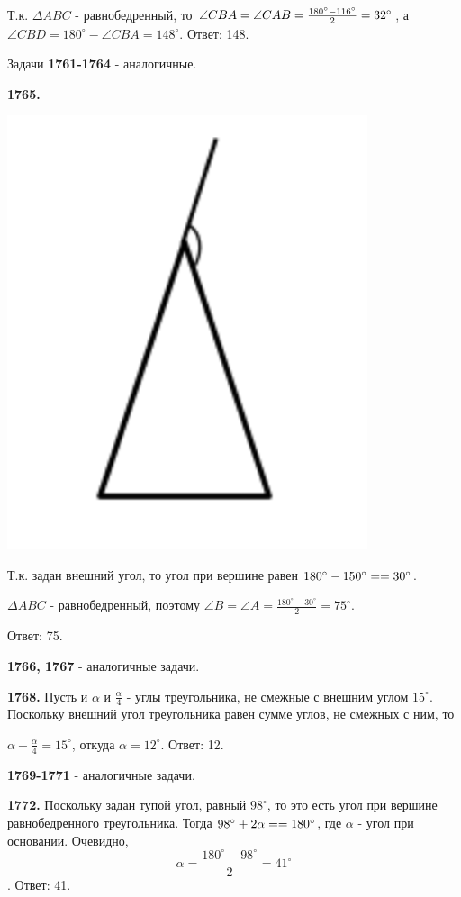 Т.к. $\Delta ABC$ - равнобедренный, то $\angle CBA = \angle CAB = \frac{180^\circ - 116^\circ}{2} = \linebreak 32^\circ$, а $\angle CBD = 180^\circ - \angle CBA = 148^\circ.$ \newline \null \hspace*{\fill} Ответ: 148.

Задачи \textbf{1761-1764} - аналогичные.

\textbf{1765.}

{\centering \includegraphics[width=0.3\linewidth]{Geometry/Content/6.png}

}

Т.к. задан внешний угол, то угол при вершине равен $180^\circ - 150^\circ = \linebreak
=30^\circ$.

$\Delta ABC$ - равнобедренный, поэтому $\angle B = \angle A = \frac{180^\circ - 30^\circ}{2} = 75^\circ$.

\null \hspace*{\fill} Ответ: 75.

\textbf{1766, 1767} - аналогичные задачи.

\textbf{1768.} Пусть и $\alpha$ и $\frac{\alpha}{4}$ - углы треугольника, не смежные с внешним углом $15^\circ$. Поскольку внешний угол треугольника равен сумме углов, не смежных с ним, то

{\centering $\alpha + \frac{\alpha}{4} = 15^\circ$, откуда $\alpha =12^\circ$. \newline \null \hspace*{\fill} Ответ: 12.

}

\textbf{1769-1771} - аналогичные задачи.

\textbf{1772.}  Поскольку задан тупой угол, равный $98^\circ$, то это есть угол при вершине равнобедренного треугольника. Тогда  $98^\circ + 2\alpha = \linebreak= 180^\circ$, где $\alpha$ - угол при основании. Очевидно, 
\[
\alpha = \frac{180^\circ - 98^\circ}{2} = 41^\circ
\].\null \hspace*{\fill} Ответ: 41.

